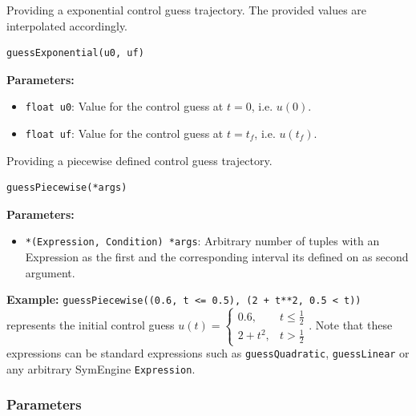 \documentclass[12pt]{article}
\begin{document}
\begin{mdframed}[backgroundcolor=gray!10, roundcorner=10pt, linewidth=1pt]

	Providing a exponential control guess trajectory. The provided values
	are interpolated accordingly.

	\begin{lstlisting}
guessExponential(u0, uf)
	\end{lstlisting}

	\textbf{Parameters:}
	\begin{itemize}
		\item \texttt{float u0}: Value for the control guess at $t=0$,
		      i.e. $u(0)$.
		\item \texttt{float uf}: Value for the control guess at
		      $t=t_f$, i.e. $u(t_f)$.
	\end{itemize}

\end{mdframed}

\begin{mdframed}[backgroundcolor=gray!10, roundcorner=10pt, linewidth=1pt]

	Providing a piecewise defined control guess trajectory.

	\begin{lstlisting}
guessPiecewise(*args)
	\end{lstlisting}

	\textbf{Parameters:}
	\begin{itemize}
		\item \texttt{*(Expression, Condition) *args}: Arbitrary number
		      of tuples with an Expression as the first and the
		      corresponding interval its
		      defined on as second argument.
	\end{itemize}

	\textbf{Example:} \texttt{guessPiecewise((0.6, t <= 0.5), (2 + t**2,
		0.5 < t))} represents the initial control guess $u(t) =
		\begin{cases}
			0.6,     & t \leq \frac{1}{2} \\
			2 + t^2, & t > \frac{1}{2}
		\end{cases}$. Note that these expressions can be standard
	expressions
	such as \texttt{guessQuadratic}, \texttt{guessLinear} or any arbitrary
	SymEngine \texttt{Expression}.
\end{mdframed}

\subsubsection{Parameters}
\end{document}
